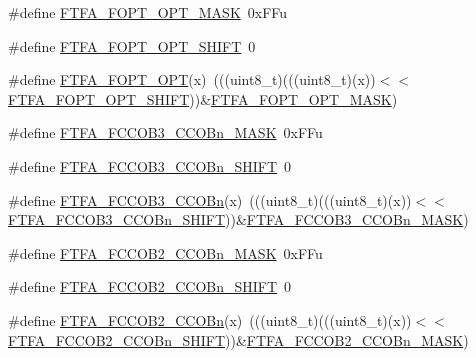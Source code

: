 \begin{DoxyCompactItemize}
\item 
\#define \hyperlink{group___f_t_f_a___register___masks_ga779df0be2be88c60f0c9e8e98850d479}{F\+T\+F\+A\+\_\+\+F\+O\+P\+T\+\_\+\+O\+P\+T\+\_\+\+M\+A\+SK}~0x\+F\+Fu
\item 
\#define \hyperlink{group___f_t_f_a___register___masks_ga89bbb59793ccc7cb270b4a285c73062f}{F\+T\+F\+A\+\_\+\+F\+O\+P\+T\+\_\+\+O\+P\+T\+\_\+\+S\+H\+I\+FT}~0
\item 
\#define \hyperlink{group___f_t_f_a___register___masks_ga490833607b9534df37400600d5e4a1dd}{F\+T\+F\+A\+\_\+\+F\+O\+P\+T\+\_\+\+O\+PT}(x)~(((uint8\+\_\+t)(((uint8\+\_\+t)(x))$<$$<$\hyperlink{group___f_t_f_a___register___masks_ga89bbb59793ccc7cb270b4a285c73062f}{F\+T\+F\+A\+\_\+\+F\+O\+P\+T\+\_\+\+O\+P\+T\+\_\+\+S\+H\+I\+FT}))\&\hyperlink{group___f_t_f_a___register___masks_ga779df0be2be88c60f0c9e8e98850d479}{F\+T\+F\+A\+\_\+\+F\+O\+P\+T\+\_\+\+O\+P\+T\+\_\+\+M\+A\+SK})
\item 
\#define \hyperlink{group___f_t_f_a___register___masks_gae1057e6e0ff5441696b4246e99fbd33f}{F\+T\+F\+A\+\_\+\+F\+C\+C\+O\+B3\+\_\+\+C\+C\+O\+Bn\+\_\+\+M\+A\+SK}~0x\+F\+Fu
\item 
\#define \hyperlink{group___f_t_f_a___register___masks_ga0ee905ea83a52a6a22d12666387f266b}{F\+T\+F\+A\+\_\+\+F\+C\+C\+O\+B3\+\_\+\+C\+C\+O\+Bn\+\_\+\+S\+H\+I\+FT}~0
\item 
\#define \hyperlink{group___f_t_f_a___register___masks_gaab7c14d906b7e4a47fde00d6aaa1ecdf}{F\+T\+F\+A\+\_\+\+F\+C\+C\+O\+B3\+\_\+\+C\+C\+O\+Bn}(x)~(((uint8\+\_\+t)(((uint8\+\_\+t)(x))$<$$<$\hyperlink{group___f_t_f_a___register___masks_ga0ee905ea83a52a6a22d12666387f266b}{F\+T\+F\+A\+\_\+\+F\+C\+C\+O\+B3\+\_\+\+C\+C\+O\+Bn\+\_\+\+S\+H\+I\+FT}))\&\hyperlink{group___f_t_f_a___register___masks_gae1057e6e0ff5441696b4246e99fbd33f}{F\+T\+F\+A\+\_\+\+F\+C\+C\+O\+B3\+\_\+\+C\+C\+O\+Bn\+\_\+\+M\+A\+SK})
\item 
\#define \hyperlink{group___f_t_f_a___register___masks_gafce9dd30cc49db588976cffd40ff31a3}{F\+T\+F\+A\+\_\+\+F\+C\+C\+O\+B2\+\_\+\+C\+C\+O\+Bn\+\_\+\+M\+A\+SK}~0x\+F\+Fu
\item 
\#define \hyperlink{group___f_t_f_a___register___masks_gaf5731dc9ee3c6ce6fdd7c31a20bb0e6c}{F\+T\+F\+A\+\_\+\+F\+C\+C\+O\+B2\+\_\+\+C\+C\+O\+Bn\+\_\+\+S\+H\+I\+FT}~0
\item 
\#define \hyperlink{group___f_t_f_a___register___masks_ga0b76c510573ac191f77fea543c3d36aa}{F\+T\+F\+A\+\_\+\+F\+C\+C\+O\+B2\+\_\+\+C\+C\+O\+Bn}(x)~(((uint8\+\_\+t)(((uint8\+\_\+t)(x))$<$$<$\hyperlink{group___f_t_f_a___register___masks_gaf5731dc9ee3c6ce6fdd7c31a20bb0e6c}{F\+T\+F\+A\+\_\+\+F\+C\+C\+O\+B2\+\_\+\+C\+C\+O\+Bn\+\_\+\+S\+H\+I\+FT}))\&\hyperlink{group___f_t_f_a___register___masks_gafce9dd30cc49db588976cffd40ff31a3}{F\+T\+F\+A\+\_\+\+F\+C\+C\+O\+B2\+\_\+\+C\+C\+O\+Bn\+\_\+\+M\+A\+SK})
$$
\end{DoxyCompactItemize}
